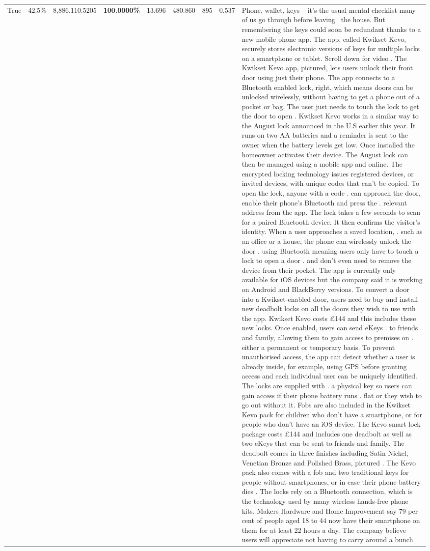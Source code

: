 \begin{table}[H]
\begin{tabular}{lllrlllll}
True & 42.5\% & 8,886,110.5205 & \bfseries \color{red} 100.0000\% & 13.696 & 480.860 & 895 & 0.537 & Phone, wallet, keys – it’s the usual mental checklist many of us go through before leaving  the house. But remembering the keys could soon be redundant thanks to a new mobile phone app. The app, called Kwikset Kevo, securely stores electronic versions of keys for multiple locks on a smartphone or tablet. Scroll down for video . The Kwikset Kevo app, pictured, lets users unlock their front door using just their phone. The app connects to a Bluetooth enabled lock, right, which means doors can be unlocked wirelessly, without having to get a phone out of a pocket or bag. The user just needs to touch the lock to get the door to open . Kwikset Kevo works in a similar way to the August lock announced in the U.S earlier this year. It runs on two AA batteries and a reminder is sent to the owner when the battery levels get low. Once installed the homeowner activates their device. The August lock can then be managed using a mobile app and online. The encrypted locking technology issues registered devices, or invited devices, with unique codes that can't be copied. To open the lock, anyone with a code . can approach the door, enable their phone's Bluetooth and press the . relevant address from the app. The lock takes a few seconds to scan for a paired Bluetooth device. It then confirms the visitor's identity. When a user approaches a saved location, . such as an office or a house, the phone can wirelessly unlock the door . using Bluetooth meaning users only have to touch a lock to open a door . and don't even need to remove the device from their pocket. The app is currently only available for iOS devices but the company said it is working on Android and BlackBerry versions. To convert a door into a Kwikset-enabled door, users need to buy and install new deadbolt locks on all the doors they wish to use with the app. Kwikset Kevo costs £144 and this includes these new locks. Once enabled, users can send eKeys . to friends and family, allowing them to gain access to premises on . either a permanent or temporary basis. To prevent unauthorised access, the app can detect whether a user is already inside, for example, using GPS before granting access and each individual user can be uniquely identified. The locks are supplied with . a physical key so users can gain access if their phone battery runs . flat or they wish to go out without it. Fobs are also included in the Kwikset Kevo pack for children who don't have a smartphone, or for people who don't have an iOS device. The Kevo smart lock package costs £144 and includes one deadbolt as well as two eKeys that can be sent to friends and family. The deadbolt comes in three finishes including Satin Nickel, Venetian Bronze and Polished Brass, pictured . The Kevo pack also comes with a fob and two traditional keys for people without smartphones, or in case their phone battery dies . The locks rely on a Bluetooth connection, which is the technology used by many wireless hands-free phone kits. Makers Hardware and Home Improvement say 79 per cent of people aged 18 to 44 now have their smartphone on them for at least 22 hours a day. The company believe users will appreciate not having to carry around a bunch 
\end{tabular}
\end{table}
